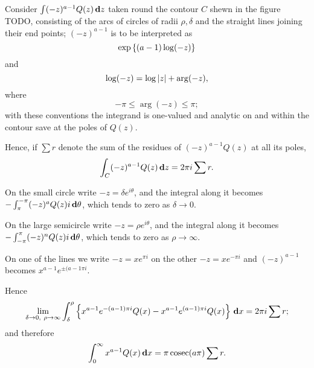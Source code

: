 %
%

Consider $\int (-z)^{a-1} Q(z) \, \mathbf{d} z$ taken round the contour
$C$ shewn in the figure TODO, consisting of the arcs of circles of
radii $\rho,\delta$ and the straight lines joining their end points;
$(-z)^{a-1}$ is
to be interpreted as
$$
\exp \left\{  ( a-1) \log (- z)  \right\}
$$
and
$$
\log (-z) = \log \left| z \right| + \arg (-z),
$$
where
$$
-\pi \leq \arg (-z) \leq \pi; %
$$
with these conventions the integrand is one-valued and analytic on and
within the contour save at the poles of $Q(z)$.

Hence, if $\sum r$ denote the sum of the residues of $(-z)^{a-1} Q(z)$
at all its poles,
$$
\int_{C} (-z)^{a-1} Q(z) \, \mathbf{d} z = 2 \pi i \sum r.
$$

On the small circle write $-z = \delta e^{i\theta}$, and the integral
along it becomes
$- \int_{\pi}^{-\pi} (-z)^{a} Q(z) i \, \mathbf{d} \theta$,
which tends to zero as $\delta \rightarrow 0$.

On the large semicircle write $-z = \rho e^{i\theta}$, and the
integral along it becomes $- \int_{-\pi}^{\pi} (-z)^{n} Q(z) i
\, \mathbf{d}\theta$, which tends to zero as $\rho \rightarrow \infty$. 

On one of the lines we write $-z = x e^{\pi i}$ on the other
$-z = x e^{-\pi i}$ and $(-z)^{a-1}$ becomes $x^{a-1} e^{\pm (a-1 \pi i}$.

Hence
$$
\lim_{\delta\rightarrow 0,\ \rho\rightarrow\infty}
\int_{\delta}^{\rho}
\thebrace{
  x^{a-1} e^{-(a-1)\pi i} Q(x)
  -
  x^{a-1} e^{(a-1)\pi i} Q(x)
}
\dmeasure x
=
2 \pi i \sum r;
$$
and therefore
$$
\int_{0}^{\infty} x^{a-1} Q(x) \, \mathbf{d} x
=
\pi \operatorname{cosec} (a\pi) \sum r.
$$

